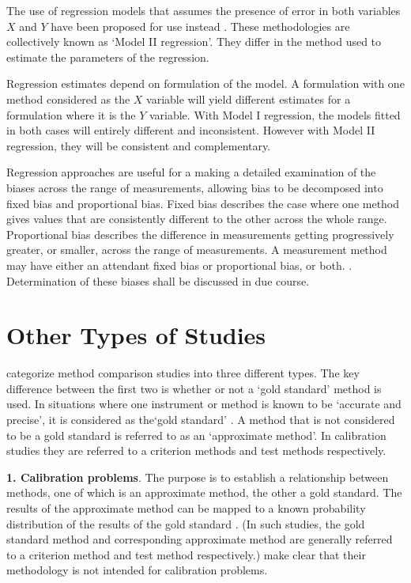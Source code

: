 \documentclass[12pt, a4paper]{report}
\theoremstyle{plain}
\theoremstyle{definition}
\theoremstyle{remark}
\begin{document}
		The use of regression models that assumes the presence of error in
		both variables $X$ and $Y$ have been proposed for use instead
		\citep{CornCoch,ludbrook97}. These methodologies are collectively
		known as `Model II regression'. They differ in the method used to
		estimate the parameters of the regression.
		
		Regression estimates depend on formulation of the model. A
		formulation with one method considered as the $X$ variable will
		yield different estimates for a formulation where it is the $Y$
		variable. With Model I regression, the models fitted in both cases
		will entirely different and inconsistent. However with Model II
		regression, they will be consistent and complementary.
		
		Regression approaches are useful for a making a detailed examination of the biases across the range of measurements, allowing bias to be decomposed into fixed bias and proportional bias.
		Fixed bias describes the case where one method gives values that are consistently different
		to the other across the whole range. Proportional
		bias describes the difference in measurements getting progressively greater, or smaller, across the range of measurements. A measurement method may have either an attendant fixed bias or proportional bias, or both. \citep{ludbrook}. Determination of these biases shall be discussed in due course.
		
		

		\section{Other Types of Studies}
		\citet{lewis} categorize method comparison studies into three
		different types.  The key difference between the first two is
		whether or not a `gold standard' method is used. In situations
		where one instrument or method is known to be `accurate and
		precise', it is considered as the`gold standard' \citep{lewis}. A
		method that is not considered to be a gold standard is referred to
		as an `approximate method'. In calibration studies they are
		referred to a criterion methods and test methods respectively.
		
		
		\textbf{1. Calibration problems}. The purpose is to establish a
		relationship between methods, one of which is an approximate
		method, the other a gold standard. The results of the approximate
		method can be mapped to a known probability distribution of the
		results of the gold standard \citep{lewis}. (In such studies, the
		gold standard method and corresponding approximate method are
		generally referred to a criterion method and test method
		respectively.) \citet*{BA83} make clear that their methodology is
		not intended for calibration problems.
		
\end{document}
